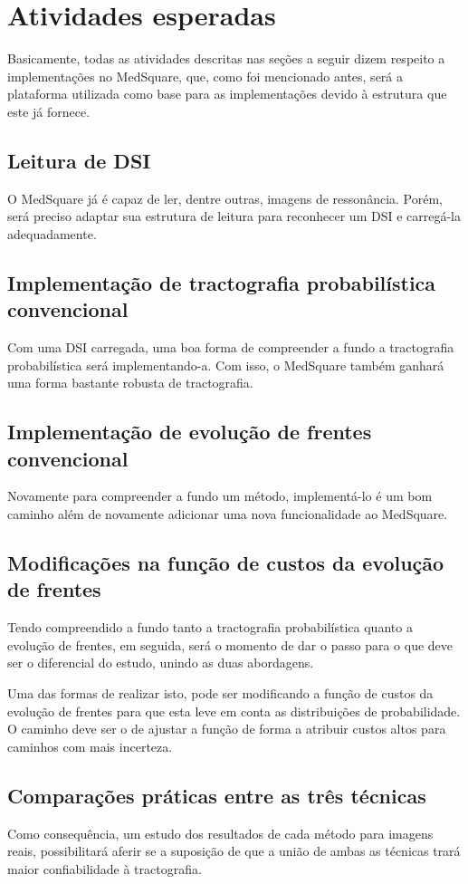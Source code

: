 \documentclass[a4paper,11pt]{report}
\begin{document}
\chapter{Atividades esperadas}
  Basicamente, todas as atividades descritas nas seções a seguir dizem respeito a implementações no MedSquare, que, como foi mencionado antes, será a plataforma utilizada como base para as implementações devido à estrutura que este já fornece.

  \section{Leitura de DSI}
  O MedSquare já é capaz de ler, dentre outras, imagens de ressonância. Porém, será preciso adaptar sua estrutura de leitura para reconhecer um DSI e carregá-la adequadamente.
  
  \section{Implementação de tractografia probabilística convencional}
  Com uma DSI carregada, uma boa forma de compreender a fundo a tractografia probabilística será implementando-a. Com isso, o MedSquare também ganhará uma forma bastante robusta de tractografia.
  
  \section{Implementação de evolução de frentes convencional}
  Novamente para compreender a fundo um método, implementá-lo é um bom caminho além de novamente adicionar uma nova funcionalidade ao MedSquare.

  \section{Modificações na função de custos da evolução de frentes}
  Tendo compreendido a fundo tanto a tractografia probabilística quanto a evolução de frentes, em seguida, será o momento de dar o passo para o que deve ser o diferencial do estudo, unindo as duas abordagens.

  Uma das formas de realizar isto, pode ser modificando a função de custos da evolução de frentes para que esta leve em conta as distribuições de probabilidade. O caminho deve ser o de ajustar a função de forma a atribuir custos altos para caminhos com mais incerteza.

  \section{Comparações práticas entre as três técnicas}
  Como consequência, um estudo dos resultados de cada método para imagens reais, possibilitará aferir se a suposição de que a união de ambas as técnicas trará maior confiabilidade à tractografia.
  
\end{document}
